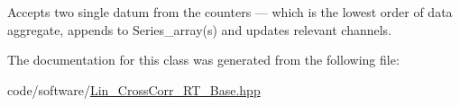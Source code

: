 Accepts two single {\ttfamily datum} from the counters — which is the lowest order of data aggregate, appends to Series\+\_\+array(s) and updates relevant channels. 



The documentation for this class was generated from the following file\+:\begin{DoxyCompactItemize}
\item 
code/software/\hyperlink{Lin__CrossCorr__RT__Base_8hpp}{Lin\+\_\+\+Cross\+Corr\+\_\+\+R\+T\+\_\+\+Base.\+hpp}\end{DoxyCompactItemize}
